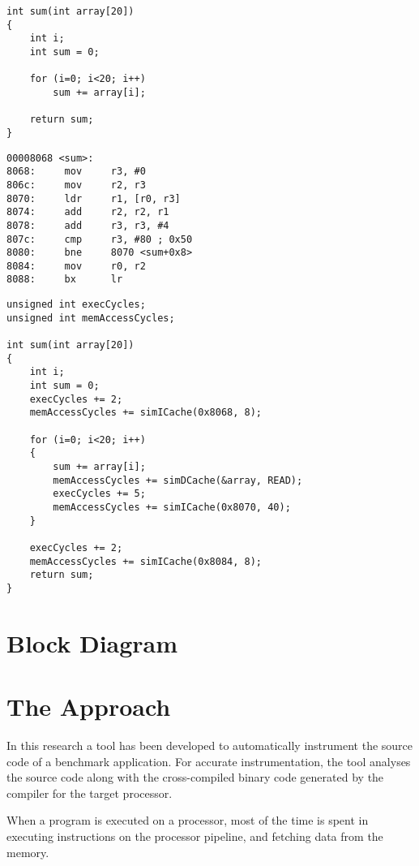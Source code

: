 \begin{minipage}{0.5\textwidth}
\begin{lstlisting}[caption={Simple C Code},label={lst:sumCCode}]
int sum(int array[20])
{
	int i;
	int sum = 0;
	
	for (i=0; i<20; i++)
		sum += array[i];
	
	return sum;
}
\end{lstlisting}
\end{minipage}%
\begin{minipage}{0.5\textwidth}
\begin{lstlisting}[caption={Objdump Code},label={lst:sumObjCode}]
00008068 <sum>:
8068:     mov     r3, #0
806c:     mov     r2, r3
8070:     ldr     r1, [r0, r3]
8074:     add     r2, r2, r1
8078:     add     r3, r3, #4
807c:     cmp     r3, #80 ; 0x50
8080:     bne     8070 <sum+0x8>
8084:     mov     r0, r2
8088:     bx      lr
\end{lstlisting}
\end{minipage}

\begin{lstlisting}[caption={Instrumented Code},label={lst:sumInstCode}]
unsigned int execCycles;
unsigned int memAccessCycles;

int sum(int array[20])
{
	int i;
	int sum = 0;
	execCycles += 2;
	memAccessCycles += simICache(0x8068, 8);
	
	for (i=0; i<20; i++)
	{
		sum += array[i];
		memAccessCycles += simDCache(&array, READ);
		execCycles += 5;
		memAccessCycles += simICache(0x8070, 40);
	}
	
	execCycles += 2;
	memAccessCycles += simICache(0x8084, 8);
	return sum;
}
\end{lstlisting}

\section{Block Diagram}


\section{The Approach}
In this research a tool has been developed to automatically instrument the source code of a benchmark application. For accurate instrumentation, the tool analyses the source code along with the cross-compiled binary code generated by the compiler for the target processor.

When a program is executed on a processor, most of the time is spent in executing instructions on the processor pipeline, and fetching data from the memory.

